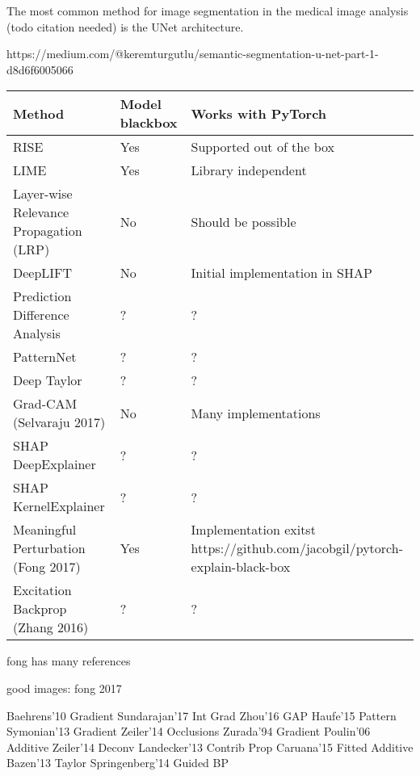 The most common method for image segmentation in the medical image analysis (todo citation needed) is the UNet\cite{todo} architecture.



https://medium.com/@keremturgutlu/semantic-segmentation-u-net-part-1-d8d6f6005066


\begin{tabular}{| p{7cm} | p{2.5cm} | p{6cm} | }
\hline
\textbf{Method} & \textbf{Model blackbox} & \textbf{Works with PyTorch} \\ \hline
RISE\cite{Petsiuk2018rise} & Yes & Supported out of the box \\ \hline
LIME\cite{ribeiro2016should} & Yes & Library independent \\ \hline
Layer-wise Relevance Propagation (LRP) & No & Should be possible  \\ \hline
DeepLIFT & No & Initial implementation in SHAP\cite{NIPS2017_7062} \\ \hline
Prediction Difference Analysis \cite{todo} & ? & ? \\ \hline
PatternNet & ? & ? \\ \hline
Deep Taylor & ? & ? \\ \hline
Grad-CAM (Selvaraju 2017) & No & Many implementations \\ \hline
SHAP DeepExplainer\cite{NIPS2017_7062} & ? & ? \\ \hline
SHAP KernelExplainer\cite{NIPS2017_7062} & ? & ? \\ \hline
Meaningful Perturbation (Fong 2017)\cite{todo} & Yes & Implementation exitst \cite{todo} https://github.com/jacobgil/pytorch-explain-black-box \\ \hline
Excitation Backprop (Zhang 2016)\cite{todo}  & ? & ? \\ \hline
\end{tabular}


fong has many references

good images: fong 2017

Baehrens'10 Gradient
Sundarajan'17 Int Grad
Zhou'16 GAP
Haufe'15 Pattern
Symonian'13 Gradient
Zeiler'14 Occlusions
Zurada'94 Gradient
Poulin'06 Additive
Zeiler'14 Deconv
Landecker'13 Contrib Prop
Caruana'15 Fitted Additive
Bazen'13 Taylor
Springenberg'14 Guided BP


